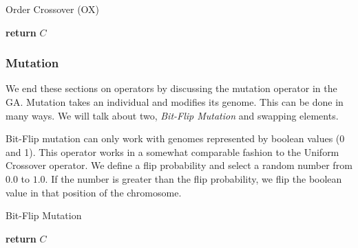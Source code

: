 \begin{algorithm}[H]
    \caption{Order Crossover (OX)}
    \begin{algorithmic}[1]
         
             
            \EndIf
             
             
                 
                \EndWhile
                 
                \EndIf
            \EndFor
            \State \textbf{return} $C$
        \EndProcedure
    \end{algorithmic}
\end{algorithm}


\subsubsection{Mutation}

We end these sections on operators by discussing the mutation operator in the GA. Mutation takes an individual and modifies its genome. This can be done in many ways. We will talk about two, \textit{Bit-Flip Mutation} and swapping elements.

Bit-Flip mutation can only work with genomes represented by boolean values (0 and 1). This operator works in a somewhat comparable fashion to the Uniform Crossover operator. We define a flip probability and select a random number from $0.0$ to $1.0$. If the number is greater than the flip probability, we flip the boolean value in that position of the chromosome.

\begin{algorithm}[H]
    \caption{Bit-Flip Mutation}
    \begin{algorithmic}[1]
                \EndIf
            \EndFor
            \State \textbf{return} $C$
        \EndProcedure
    \end{algorithmic}
\end{algorithm}


